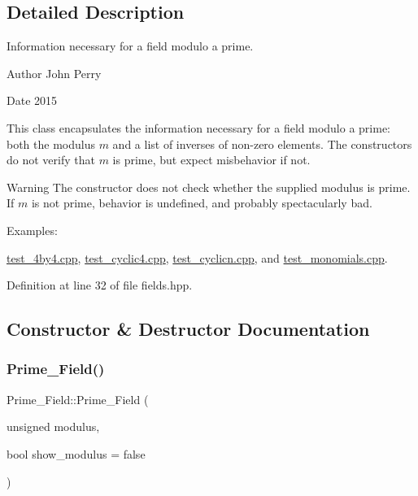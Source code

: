 \subsection{Detailed Description}
Information necessary for a field modulo a prime. 

\begin{DoxyAuthor}{Author}
John Perry 
\end{DoxyAuthor}
\begin{DoxyDate}{Date}
2015
\end{DoxyDate}
This class encapsulates the information necessary for a field modulo a prime\+: both the modulus $m$ and a list of inverses of non-\/zero elements. The constructors do not verify that $m$ is prime, but expect misbehavior if not.

\begin{DoxyWarning}{Warning}
The constructor does not check whether the supplied modulus is prime. If $m$ is not prime, behavior is undefined, and probably spectacularly bad. 
\end{DoxyWarning}
\begin{Desc}
\item[Examples\+: ]\par
\hyperlink{test_4by4_8cpp-example}{test\+\_\+4by4.\+cpp}, \hyperlink{test_cyclic4_8cpp-example}{test\+\_\+cyclic4.\+cpp}, \hyperlink{test_cyclicn_8cpp-example}{test\+\_\+cyclicn.\+cpp}, and \hyperlink{test_monomials_8cpp-example}{test\+\_\+monomials.\+cpp}.\end{Desc}


Definition at line 32 of file fields.\+hpp.



\subsection{Constructor \& Destructor Documentation}
\mbox{\label{class_prime___field_a22532f2a53d6c03714bfaa71e25cb06b}} 
\subsubsection{\texorpdfstring{Prime\+\_\+\+Field()}{Prime\_Field()}\hspace{0.1cm}{\footnotesize\ttfamily [1/2]}}
{\footnotesize\ttfamily Prime\+\_\+\+Field\+::\+Prime\+\_\+\+Field (\begin{DoxyParamCaption}\item[{unsigned}]{modulus,  }\item[{bool}]{show\+\_\+modulus = {\ttfamily false} }\end{DoxyParamCaption})}



